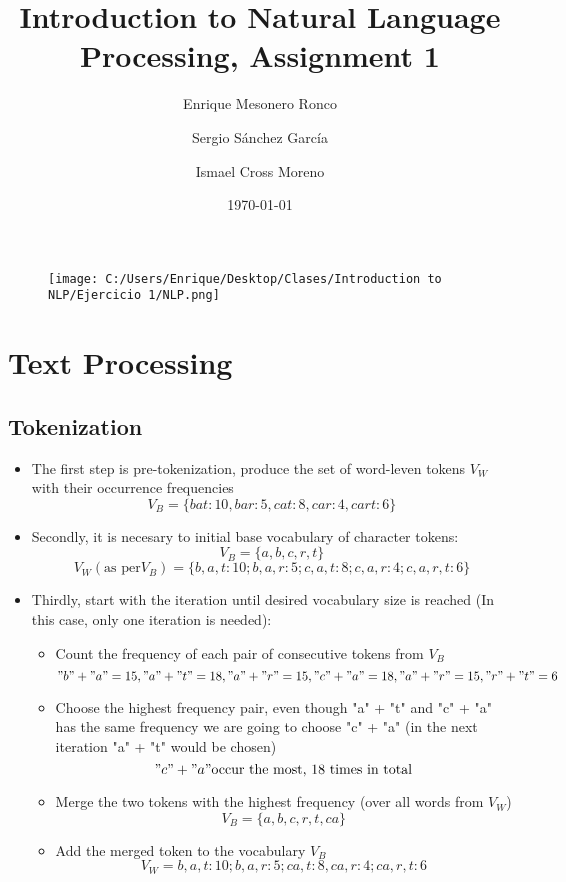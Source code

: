 \documentclass{article}
\title{ Introduction to Natural Language Processing, Assignment 1 }
\author{ Enrique Mesonero Ronco \and Sergio Sánchez García \and Ismael Cross Moreno }
\date{\today}
\begin{document}
\maketitle
\begin{figure}[h!]
	\texttt{[image: C:/Users/Enrique/Desktop/Clases/Introduction to NLP/Ejercicio 1/NLP.png]}
\end{figure}
\newpage
\tableofcontents
\newpage
\section { Text Processing }
	\subsection { Tokenization }
	 \begin{itemize}
	\item The first step is pre-tokenization, produce the set of word-leven tokens $V_W$ with their occurrence frequencies
		\begin{equation*}
			V_B = \{ bat: 10, bar: 5, cat: 8, car: 4, cart: 6 \}
		\end{equation*}
	\item Secondly, it is necesary to initial base vocabulary of character tokens:
		\begin{equation*}
			V_B = \{a,b,c,r,t\}
		\end{equation*}
		\begin{equation*}
			V_W (\text{as per} V_B) = \{b, a, t: 10; b, a, r: 5; c, a, t: 8; c, a, r: 4; c, a, r, t: 6\}
		\end{equation*}

	\item Thirdly, start with the iteration until desired vocabulary size is reached (In this case, only one iteration is needed):
		\begin{itemize}
		\item Count the frequency of each pair of consecutive tokens from $V_B$
		\begin{equation*}
			"b" + "a" = 15, "a" + "t" = 18, "a" + "r"  = 15, "c" + "a" = 18, "a" + "r" = 15, "r" + "t" = 6
		\end{equation*}
		\item Choose the highest frequency pair, even though "a" + "t" and "c" + "a" has the same frequency we are going to choose "c" + "a" (in the next iteration "a" + "t" would be chosen)
		\begin{equation*}
			"c" + "a" \text{occur the most, 18 times in total}
		\end{equation*}
		\item Merge the two tokens with the highest frequency (over all words from $V_W$)
		\begin{equation*}
			V_B=\{a,b,c,r,t,ca\}
		\end{equation*}
		\item Add the merged token to the vocabulary $V_B$
		\begin{equation*}
			V_W={b, a, t: 10; b, a, r: 5; ca, t: 8, ca, r: 4; ca, r, t: 6}
		\end{equation*}
		\end{itemize}
	\end{itemize}
\end{document}

